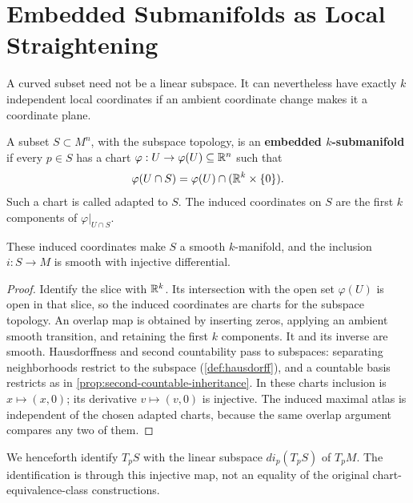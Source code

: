 \section{Embedded Submanifolds as Local Straightening}
\label{sec:embedded-submanifolds}
A curved subset need not be a linear subspace. It can nevertheless have
exactly $k$ independent local coordinates if an ambient coordinate change
makes it a coordinate plane.
\begin{definition}\label{def:embedded-submanifold}
A subset $S\subset M^n$, with the subspace topology, is an
\textbf{embedded $k$-submanifold} if every $p\in S$ has a chart
$\varphi:U\to\varphi(U)\subseteq\mathbb{R}^n$ such that
\[
\varphi(U\cap S)=\varphi(U)\cap(\mathbb{R}^k\times\{0\}).
\]
Such a chart is called adapted to $S$. The induced coordinates on $S$ are
the first $k$ components of $\varphi|_{U\cap S}$.
\end{definition}
\begin{proposition}
These induced coordinates make $S$ a smooth $k$-manifold, and the inclusion
$i:S\to M$ is smooth with injective differential.
\end{proposition}
\begin{proof}
Identify the slice with $\mathbb{R}^k$. Its intersection with the open set
$\varphi(U)$ is open in that slice, so the induced coordinates are charts
for the subspace topology. An overlap map is obtained by inserting zeros,
applying an ambient smooth transition, and retaining the first $k$
components. It and its inverse are smooth. Hausdorffness and second
countability pass to subspaces: separating neighborhoods restrict to
the subspace (\cref{def:hausdorff}), and a countable basis restricts
as in \cref{prop:second-countable-inheritance}.
In these charts inclusion is $x\mapsto(x,0)$; its derivative
$v\mapsto(v,0)$ is injective. The induced maximal atlas is independent of
the chosen adapted charts, because the same overlap argument compares
any two of them.
\end{proof}
We henceforth identify $T_pS$ with the linear subspace $di_p(T_pS)$ of
$T_pM$. The identification is through this injective map, not an equality
of the original chart-equivalence-class constructions.

